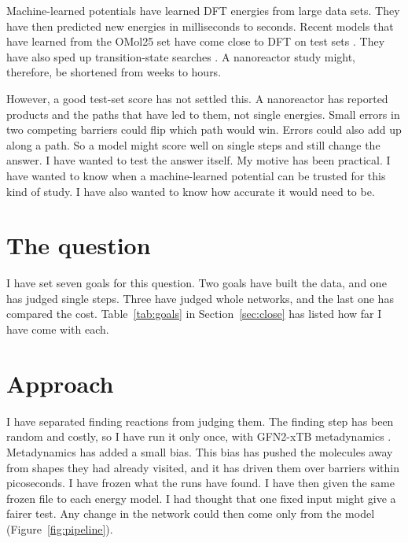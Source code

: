 \documentclass[11pt]{article}
\begin{document}
Machine-learned potentials have learned DFT energies from large data sets.
They have then predicted new energies in milliseconds to seconds. Recent
models that have learned from the OMol25 set have come close to DFT on
test sets \cite{omol25,uma,mace}. They have also sped up transition-state
searches \cite{marks2026}. A nanoreactor study might, therefore, be
shortened from weeks to hours.

However, a good test-set score has not settled this. A nanoreactor has
reported products and the paths that have led to them, not single
energies. Small errors in two competing barriers could flip which path
would win. Errors could also add up along a path. So a model might score
well on single steps and still change the answer. I have wanted to test
the answer itself. My motive has been practical. I have wanted to know
when a machine-learned potential can be trusted for this kind of study. I
have also wanted to know how accurate it would need to be.

\section{The question}

\begin{center}
\end{center}

\noindent I have set seven goals for this question. Two goals have built
the data, and one has judged single steps. Three have judged whole
networks, and the last one has compared the cost. Table~\ref{tab:goals}
in Section~\ref{sec:close} has listed how far I have come with each.

\section{Approach}

I have separated finding reactions from judging them. The finding step has
been random and costly, so I have run it only once, with GFN2-xTB
metadynamics \cite{gfn2,grimme2019}. Metadynamics has added a small bias.
This bias has pushed the molecules away from shapes they had already
visited, and it has driven them over barriers within picoseconds. I have
frozen what the runs have found. I have then given the same frozen file to
each energy model. I had thought that one fixed input might give a fairer
test. Any change in the network could then come only from the model
(Figure~\ref{fig:pipeline}).
\end{document}
